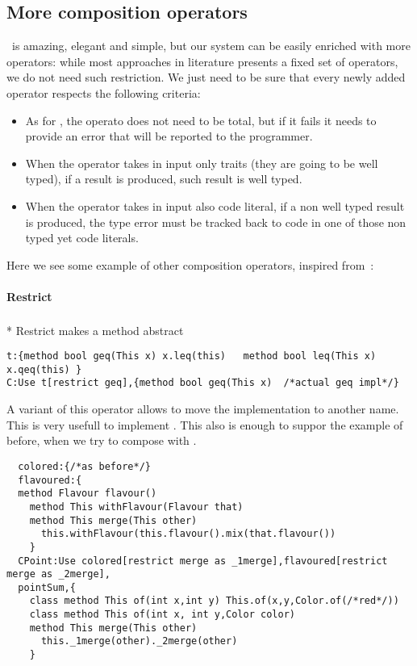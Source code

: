 \subsection{More composition operators}
\use\ is amazing, elegant and simple, but our system can be easily enriched with more 
operators: while most approaches in literature presents a fixed set of operators, we do not need such restriction.
We just need to be sure that every newly added operator respects the following criteria:

\begin{itemize}
\item As for \use, the operato does not need to be total, but if it fails it needs to provide an error that will be reported to the programmer.
\item When the operator takes in input only traits (they are going to be well typed), if a result is produced,
 such result is well typed.
\item When the operator takes in input also code literal, if a non well typed result is produced,
the type error must be tracked back to code in one of those non typed yet code literals.
 \end{itemize}


Here we see some example of other composition operators, inspired from~\cite{servetto2014meta}:
\paragraph{Restrict}${}_{}$\\*
Restrict makes a method abstract
\begin{lstlisting}
t:{method bool geq(This x) x.leq(this)   method bool leq(This x) x.qeq(this) }
C:Use t[restrict geq],{method bool geq(This x)  /*actual geq impl*/}
\end{lstlisting}

A variant of this operator allows to move the implementation to another name. This is very usefull to implement \Q@super@. This also is enough to suppor the example of before, when we try to compose \Q@colored@
with \Q@flavoured@.

\begin{lstlisting}
  colored:{/*as before*/}
  flavoured:{
  method Flavour flavour()
    method This withFlavour(Flavour that)
    method This merge(This other)
      this.withFlavour(this.flavour().mix(that.flavour())
    }
  CPoint:Use colored[restrict merge as _1merge],flavoured[restrict merge as _2merge],
  pointSum,{
    class method This of(int x,int y) This.of(x,y,Color.of(/*red*/))
    class method This of(int x, int y,Color color)
    method This merge(This other)
      this._1merge(other)._2merge(other)
    }
\end{lstlisting}

